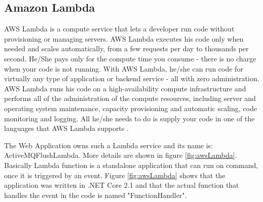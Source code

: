 \newpage

\subsection{Amazon Lambda}
\label{chap:04:03:07}

AWS Lambda is a compute service that lets a developer run code without provisioning or managing servers. AWS Lambda executes his code only when needed and scales automatically, from a few requests per day to thousands per second. He/She pays only for the compute time you consume - there is no charge when your code is not running. With AWS Lambda, he/she can run code for virtually any type of application or backend service - all with zero administration. AWS Lambda runs his code on a high-availability compute infrastructure and performs all of the administration of the compute resources, including server and operating system maintenance, capacity provisioning and automatic scaling, code monitoring and logging. All he/she needs to do is supply your code in one of the languages that AWS Lambda supports \cite{aws-lambda}.

The Web Application owns such a Lambda service and its name is: ActiveMQFlushLambda. More details are shown in figure \ref{fig:awsLambda}. Basically Lambda function is a standalone application that can run on command, once it is triggered by an event. Figure \ref{fig:awsLambda} shows that the application was written in .NET Core 2.1 and that the actual function that handles the event in the code is named "FunctionHandler".

